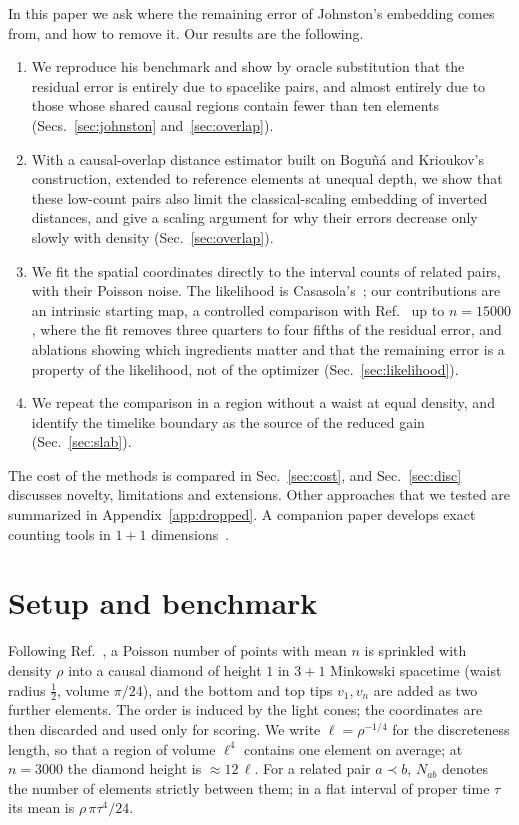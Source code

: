 \documentclass[prd,twocolumn,superscriptaddress,nofootinbib,amsmath,amssymb,floatfix]{revtex4-2}
\begin{document}
In this paper we ask where the remaining error of Johnston's embedding comes from, and how to remove it. Our results are the following.
\begin{enumerate}
\item We reproduce his benchmark and show by oracle substitution that the residual error is entirely due to spacelike pairs, and almost entirely due to those whose shared causal regions contain fewer than ten elements (Secs.~\ref{sec:johnston} and~\ref{sec:overlap}).
\item With a causal-overlap distance estimator built on Bogu\~n\'a and Krioukov's construction, extended to reference elements at unequal depth, we show that these low-count pairs also limit the classical-scaling embedding of inverted distances, and give a scaling argument for why their errors decrease only slowly with density (Sec.~\ref{sec:overlap}).
\item We fit the spatial coordinates directly to the interval counts of related pairs, with their Poisson noise. The likelihood is Casasola's~\cite{Casasola26}; our contributions are an intrinsic starting map, a controlled comparison with Ref.~\cite{Johnston25} up to $n=15000$, where the fit removes three quarters to four fifths of the residual error, and ablations showing which ingredients matter and that the remaining error is a property of the likelihood, not of the optimizer (Sec.~\ref{sec:likelihood}).
\item We repeat the comparison in a region without a waist at equal density, and identify the timelike boundary as the source of the reduced gain (Sec.~\ref{sec:slab}).
\end{enumerate}
The cost of the methods is compared in Sec.~\ref{sec:cost}, and Sec.~\ref{sec:disc} discusses novelty, limitations and extensions. Other approaches that we tested are summarized in Appendix~\ref{app:dropped}. A companion paper develops exact counting tools in $1+1$ dimensions~\cite{Toolkit}.

\section{Setup and benchmark}\label{sec:setup}
Following Ref.~\cite{Johnston25}, a Poisson number of points with mean $n$ is sprinkled with density $\rho$ into a causal diamond of height $1$ in $3+1$ Minkowski spacetime (waist radius $\tfrac12$, volume $\pi/24$), and the bottom and top tips $v_1,v_n$ are added as two further elements. The order is induced by the light cones; the coordinates are then discarded and used only for scoring. We write $\ell=\rho^{-1/4}$ for the discreteness length, so that a region of volume $\ell^4$ contains one element on average; at $n=3000$ the diamond height is $\approx 12\,\ell$. For a related pair $a\prec b$, $N_{ab}$ denotes the number of elements strictly between them; in a flat interval of proper time $\tau$ its mean is $\rho\,\pi\tau^4/24$.
\end{document}
